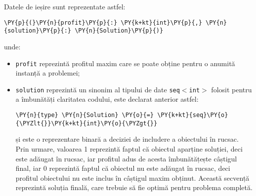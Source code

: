 \begin{sloppypar}
Datele de ieșire sunt reprezentate astfel:
\begin{Verbatim}[commandchars=\\\{\}]
                \PY{p}{(}\PY{n}{profit}\PY{p}{:} \PY{k+kt}{int}\PY{p}{,} \PY{n}{solution}\PY{p}{:} \PY{n}{Solution}\PY{p}{)}
\end{Verbatim}
unde:
\begin{itemize}
    \item \texttt{profit} reprezintă profitul maxim care se poate obține pentru o anumită instanță a problemei;
    \item \texttt{solution} reprezintă un sinonim al tipului de date \texttt{seq\(<\)int\(>\)} folosit pentru a îmbunătăți claritatea codului, este declarat anterior astfel:
\begin{Verbatim}[commandchars=\\\{\}]
                \PY{n}{type} \PY{n}{Solution} \PY{o}{=} \PY{k+kt}{seq}\PY{o}{\PYZlt{}}\PY{k+kt}{int}\PY{o}{\PYZgt{}}
\end{Verbatim}
și este o reprezentare binară a deciziei de includere a obiectului în rucsac. Prin urmare, valoarea 1 reprezintă faptul că obiectul aparține soluției, deci este adăugat în rucsac, iar profitul adus de acesta îmbunătățește câștigul final, iar 0 reprezintă faptul că obiectul nu este adăugat în rucsac, deci profitul obiectului nu este inclus în câștigul maxim obținut. Această secvență reprezintă soluția finală, care trebuie să fie optimă pentru problema completă.
\end{itemize} 

\end{sloppypar}